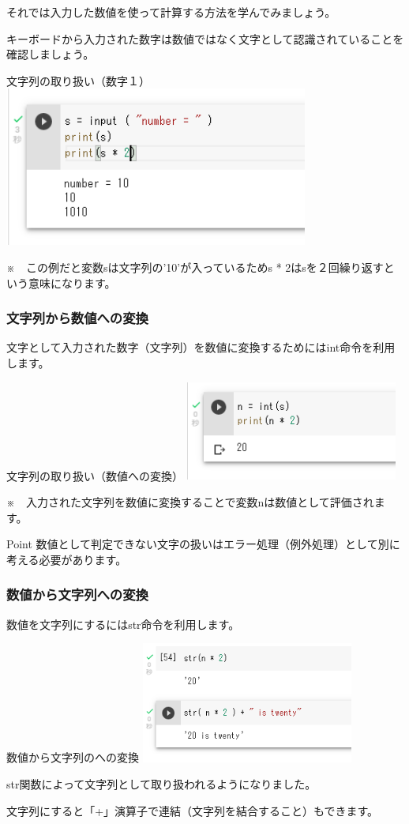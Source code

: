 \documentclass[11pt,a4paper,dvipdfmx,titlepage]{jsreport}
\begin{document}
それでは入力した数値を使って計算する方法を学んでみましょう。

キーボードから入力された数字は数値ではなく文字として認識されていることを確認しましょう。

\begin{grabox}{文字列の取り扱い（数字１）}
\includegraphics[width=10cm]{images/colab21.png}

※　この例だと変数sは文字列の'10'が入っているためs * 2はsを２回繰り返すという意味になります。

\end{grabox}
\subsubsection{文字列から数値への変換}
文字として入力された数字（文字列）を数値に変換するためにはint命令を利用します。
\begin{grabox}{文字列の取り扱い（数値への変換）}
\includegraphics[width=7cm]{images/colab22.png}

※　入力された文字列を数値に変換することで変数nは数値として評価されます。

\end{grabox}
\begin{hipoint}{Point}
数値として判定できない文字の扱いはエラー処理（例外処理）として別に考える必要があります。
\end{hipoint}
\subsubsection{数値から文字列への変換}
数値を文字列にするにはstr命令を利用します。
\begin{grabox}{数値から文字列のへの変換}
\includegraphics[width=7cm]{images/colab23.png}

str関数によって文字列として取り扱われるようになりました。
\end{grabox}
文字列にすると「+」演算子で連結（文字列を結合すること）もできます。
\end{document}
